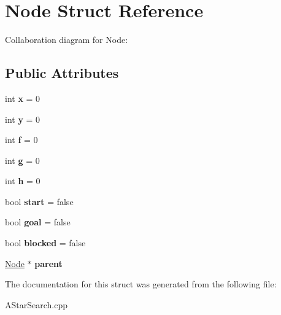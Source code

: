 \hypertarget{structNode}{}\section{Node Struct Reference}
\label{structNode}


Collaboration diagram for Node\+:
\subsection*{Public Attributes}
\begin{DoxyCompactItemize}
\item 
\mbox{\label{structNode_aff1029a518bdc2651007b8856f958364}} 
int {\bfseries x} = 0
\item 
\mbox{\label{structNode_aa3e5b5240023b4528ae85057b3324202}} 
int {\bfseries y} = 0
\item 
\mbox{\label{structNode_a32fbe9e0f4fc9e9d1845ce808738d7ab}} 
int {\bfseries f} = 0
\item 
\mbox{\label{structNode_a0b249888eacdec6c623ec8c58b230c48}} 
int {\bfseries g} = 0
\item 
\mbox{\label{structNode_afb5a7ac7536a9e09488bb685420cd78a}} 
int {\bfseries h} = 0
\item 
\mbox{\label{structNode_a1d5854f89d8291b5790f6c428ee293ff}} 
bool {\bfseries start} = false
\item 
\mbox{\label{structNode_a8452fe942107b0ca329892da2dbbbfbc}} 
bool {\bfseries goal} = false
\item 
\mbox{\label{structNode_a70279747a19694e4ba0e6ac4dbc84967}} 
bool {\bfseries blocked} = false
\item 
\mbox{\label{structNode_ad8184598cdea70e4bbdfd76f2b0f9e85}} 
\hyperlink{structNode}{Node} $\ast$ {\bfseries parent}
\end{DoxyCompactItemize}


The documentation for this struct was generated from the following file\+:\begin{DoxyCompactItemize}
\item 
A\+Star\+Search.\+cpp\end{DoxyCompactItemize}
